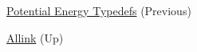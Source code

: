 
\begin{DoxyItemize}
\item \hyperlink{typedef_page}{\-Potential \-Energy \-Typedefs} (\-Previous)  
\item \hyperlink{index}{\-Allink} (\-Up)  
\end{DoxyItemize}